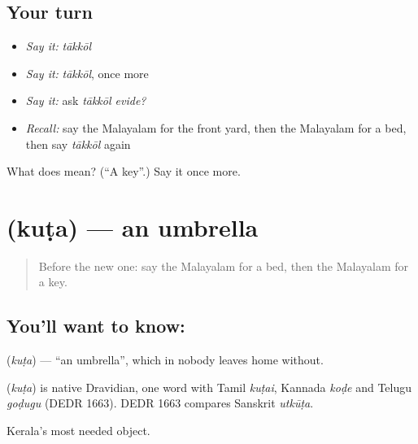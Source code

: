 \subsection*{Your turn}
\begin{itemize}
\raggedright
  \item \emph{Say it:} \emph{tākkōl}
  \item \emph{Say it:} \emph{tākkōl}, once more
  \item \emph{Say it:} ask \emph{tākkōl evide?}
  \item \emph{Recall:} say the Malayalam for the front yard, then the Malayalam for a bed, then say \emph{tākkōl} again
\end{itemize}

\begin{tcolorbox}[breakable,colback=teal!4,colframe=teal!35!black,title={Before you move on}]
What does  mean? (\textquotedblleft{}A key\textquotedblright{}.) Say it once more.
\end{tcolorbox}
\section[\texorpdfstring{\ml{കുട} (kuṭa)}{കുട (kuṭa)}]{ (kuṭa) — an umbrella}

\label{lesson:ML-C129-umbrella}



\begin{quote}
Before the new one: say the Malayalam for a bed, then the Malayalam for a key.
\end{quote}

\subsection*{You'll want to know: }
\textbf{} (\emph{kuṭa}) — \textquotedblleft{}an umbrella\textquotedblright{}, which in \textbf{} nobody leaves home without.

\begin{cousinweb}
\textbf{} (\emph{kuṭa}) is native Dravidian, one word with Tamil \emph{kuṭai}, Kannada \emph{koḍe} and Telugu \emph{goḍugu} (DEDR 1663). DEDR 1663 compares Sanskrit \emph{utkūṭa}.
\end{cousinweb}

\begin{grammarlens}[title={What you've built}]
Kerala's most needed object.
\end{grammarlens}

